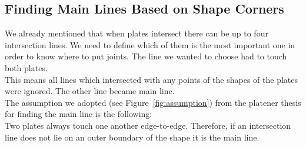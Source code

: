 \documentclass[../ClassicThesis.tex]{subfiles}
\begin{document}
\subsection{Finding Main Lines Based on Shape Corners}
We already mentioned that when plates intersect there can be up to four intersection lines. We need to define which of them is the most important one in order to know where to put joints. The line we wanted to choose had to touch both plates.\\
This means all lines which intersected with any points of the shapes of the plates were ignored. The other line became main line.\\
The assumption we adopted (see Figure~\ref{fig:assumption}) from the platener thesis \cite{master-thesis} for finding the main line is the following:\\
Two plates always touch one another edge-to-edge. Therefore, if an intersection line does not lie on an outer boundary of the shape it is the main line.
\end{document}
